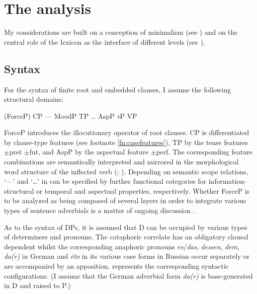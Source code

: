 \documentclass[output=paper,
colorlinks,
citecolor=brown,
newtxmath
]{langscibook}
\begin{document}

\section{The analysis}\label{s:2}

My considerations are built on a conception of minimalism (see \citealt{Chomsky1995,Chomsky2001}) and on the central role of the lexicon as the interface of different levels (see \citealt{Zimmermann1987,JackendoffAudrintoappear}).


\subsection{Syntax}\label{s:2.1}
For the syntax of finite root and embedded clauses, I assume the following structural domains:

\ea\label{ex:6} (ForceP) CP --- MoodP TP {\dots} AspP \textit{v}P VP \z

\noindent ForceP introduces the illocutionary operator of root clauses. CP is differentiated by clause-type features (see footnote \ref{fn:casefeatures}), TP by the tense features $\pm$pret $\pm$fut, and AspP by the aspectual feature $\pm$perf. The corresponding feature combinations are semantically interpreted and mirrored in the morphological word structure of the inflected verb (\citealt{Zimmermann1990,Zimmermann2013}; \citealt{Pitsch2014a,Pitsch2014b}). Depending on semantic scope relations, `---' and `{\dots}' in  can be specified by further functional categories for information-structural or temporal and aspectual properties, respectively. Whether ForceP is to be analyzed as being composed of several layers in order to integrate various types of sentence adverbials is a matter of ongoing discussion \citep[see, a.o.,][]{Krifka2021}.

As to the syntax of DPs, it is assumed that D can be occupied by various types of determiners and pronouns. The cataphoric correlate has an obligatory clausal dependent whilst the corresponding anaphoric pronouns \textit{es}/\textit{das}, \textit{dessen}, \textit{dem}, \textit{da(r)} in German and \textit{ėto} in its various case forms in Russian occur separately or are accompanied by an apposition.  represents the corresponding syntactic configurations. (I assume that the German adverbial form \textit{da(r)} is base-generated in D and raised to P.)
\end{document}
